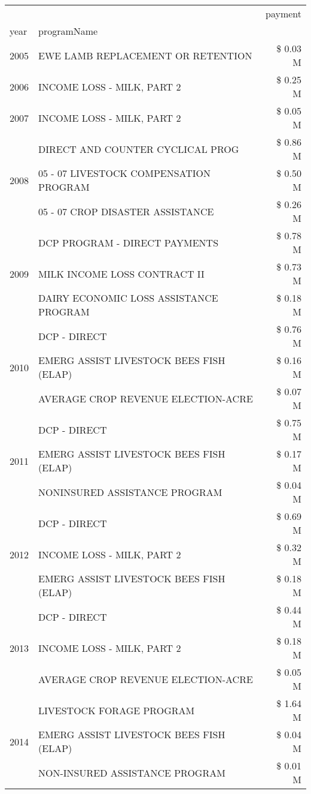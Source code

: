 \begin{tabular}{llr}
\toprule
 &  & payment \\
year & programName &  \\
\midrule
2005 & EWE LAMB REPLACEMENT OR RETENTION & \$ 0.03 M \\
\cline{1-3}
2006 & INCOME LOSS - MILK, PART 2 & \$ 0.25 M \\
\cline{1-3}
2007 & INCOME LOSS - MILK, PART 2 & \$ 0.05 M \\
\cline{1-3}
\multirow[t]{3}{*}{2008} & DIRECT AND COUNTER CYCLICAL PROG & \$ 0.86 M \\
 & 05 - 07 LIVESTOCK COMPENSATION PROGRAM & \$ 0.50 M \\
 & 05 - 07 CROP DISASTER ASSISTANCE & \$ 0.26 M \\
\cline{1-3}
\multirow[t]{3}{*}{2009} & DCP PROGRAM - DIRECT PAYMENTS & \$ 0.78 M \\
 & MILK INCOME LOSS CONTRACT II & \$ 0.73 M \\
 & DAIRY ECONOMIC LOSS ASSISTANCE PROGRAM & \$ 0.18 M \\
\cline{1-3}
\multirow[t]{3}{*}{2010} & DCP - DIRECT & \$ 0.76 M \\
 & EMERG ASSIST LIVESTOCK BEES FISH (ELAP) & \$ 0.16 M \\
 & AVERAGE CROP REVENUE ELECTION-ACRE & \$ 0.07 M \\
\cline{1-3}
\multirow[t]{3}{*}{2011} & DCP - DIRECT & \$ 0.75 M \\
 & EMERG ASSIST LIVESTOCK BEES FISH (ELAP) & \$ 0.17 M \\
 & NONINSURED ASSISTANCE PROGRAM & \$ 0.04 M \\
\cline{1-3}
\multirow[t]{3}{*}{2012} & DCP - DIRECT & \$ 0.69 M \\
 & INCOME LOSS - MILK, PART 2 & \$ 0.32 M \\
 & EMERG ASSIST LIVESTOCK BEES FISH (ELAP) & \$ 0.18 M \\
\cline{1-3}
\multirow[t]{3}{*}{2013} & DCP - DIRECT & \$ 0.44 M \\
 & INCOME LOSS - MILK, PART 2 & \$ 0.18 M \\
 & AVERAGE CROP REVENUE ELECTION-ACRE & \$ 0.05 M \\
\cline{1-3}
\multirow[t]{3}{*}{2014} & LIVESTOCK FORAGE PROGRAM & \$ 1.64 M \\
 & EMERG ASSIST LIVESTOCK BEES FISH (ELAP) & \$ 0.04 M \\
 & NON-INSURED ASSISTANCE PROGRAM & \$ 0.01 M \\
\cline{1-3}

\end{tabular}
